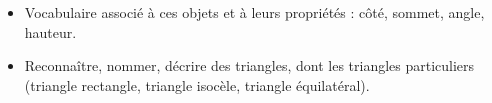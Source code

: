 \begin{prerequis}    
   \begin{itemize}        
       \item[\emoji{red-heart}] Vocabulaire associé à ces objets et à leurs propriétés : côté, sommet, angle, hauteur.
       \columnbreak
       \item[\emoji{diamond-suit}] Reconnaître, nommer, décrire des triangles, dont les triangles particuliers (triangle rectangle, triangle isocèle, triangle équilatéral).       
   \end{itemize}
\end{prerequis}